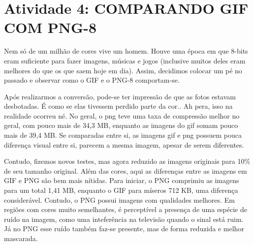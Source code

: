 \captionsetup{justification=centering,margin=0cm}
\label{cap:atividade4}  %

\chapter[Atividade 4: COMPARANDO GIF COM PNG-8]{Atividade 4: COMPARANDO GIF COM PNG-8}

Nem só de um milhão de cores vive um homem. Houve uma época em que 8-bits eram suficiente para fazer imagens, músicas e jogos (inclusive muitos deles eram melhores do que os que saem hoje em dia). Assim, decidimos colocar um pé no passado e observar como o GIF e o PNG-8 comportam-se.

\paragrafo Após realizarmos a conversão, pode-se ter impressão de que as fotos estavam desbotadas. É como se elas tivessem perdido parte da cor.. Ah pera, isso na realidade ocorreu né. No geral, o png teve uma taxa de compressão melhor no geral, com pouco mais de 34,3 MB, enquanto as imagens do gif somam pouco mais de 39,4 MB. Se comparadas entre si, as imagens gif e png possuem pouca diferença visual entre si, parecem a mesma imagem, apesar de serem diferentes.

\paragrafo Contudo, fizemos novos testes, mas agora reduzido as imagens originais para 10\% de seu tamanho original. Além das cores, aqui as diferenças entre as imagens em GIF e PNG são bem mais nítidas. Para iniciar, o PNG comprimiu as imagens para um total 1,41 MB, enquanto o GIF para míseros 712 KB, uma diferença considerável. Contudo, o PNG possui imagens com qualidades melhores. Em regiões com cores muito semelhantes, é perceptível a presença de uma espécie de ruído na imagem, como uma inteferência na televisão quando o sinal está ruim. Já no PNG esse ruído também faz-se presente, mas de forma reduzida e melhor mascarada.